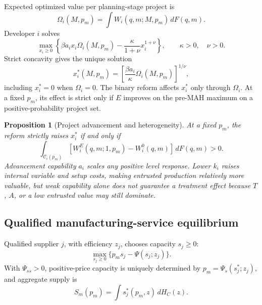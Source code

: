 \documentclass[12pt]{article}
\newtheorem{proposition}{Proposition}
\newcommand{\1}{\mathbf{1}}
\begin{document}
Expected optimized value per planning-stage project is
\begin{equation}
  \Omega_i(M,p_m)
  =
  \int W_i(q,m;M,p_m)\,dF(q,m).
  \label{eq:p16m-omega}
\end{equation}
Developer \(i\) solves
\begin{equation}
  \max_{x_i\geq0}
  \left\{
  \beta a_ix_i\Omega_i(M,p_m)
  -
  \frac{\kappa}{1+\nu}x_i^{1+\nu}
  \right\},
  \qquad \kappa>0,\quad \nu>0.
  \label{eq:p16m-advancement-problem}
\end{equation}
Strict concavity gives the unique solution
\begin{equation}
  x_i^*(M,p_m)
  =
  \left[
  \frac{\beta a_i}{\kappa}\Omega_i(M,p_m)
  \right]^{1/\nu},
  \label{eq:p16m-advancement}
\end{equation}
including \(x_i^*=0\) when \(\Omega_i=0\). The binary reform affects
\(x_i^*\) only through \(\Omega_i\). At a fixed \(p_m\), its effect is
strict only if \(E\) improves on the pre-MAH maximum on a
positive-probability project set.

\begin{proposition}[Project advancement and heterogeneity]
\label{prop:main-advancement}
At a fixed \(p_m\), the reform strictly raises \(x_i^*\) if and only if
\begin{equation}
  \int_{\mathcal C_i(p_m)}
  [W_i^E(q,m;1,p_m)-W_i^0(q,m)]\,dF(q,m)>0.
  \label{eq:p16m-strict-advancement}
\end{equation}
Advancement capability \(a_i\) scales any positive level response. Lower
\(k_i\) raises internal variable and setup costs, making entrusted production
relatively more valuable, but weak capability alone does not guarantee a
treatment effect because \(T\), \(A\), or a low entrusted value may still
dominate.
\end{proposition}

\subsection{Qualified manufacturing-service equilibrium}
\label{subsec:p16m-cmo}

Qualified supplier \(j\), with efficiency \(z_j\), chooses capacity
\(s_j\geq0\):
\begin{equation}
  \max_{s_j\geq0}\{p_ms_j-\Psi(s_j;z_j)\}.
  \label{eq:p16m-supplier}
\end{equation}
With \(\Psi_{ss}>0\), positive-price capacity is uniquely determined by
\(p_m=\Psi_s(s_j^*;z_j)\), and aggregate supply is
\[
  S_m(p_m)=\int s_j^*(p_m,z)\,dH_C(z).
\]
\end{document}
